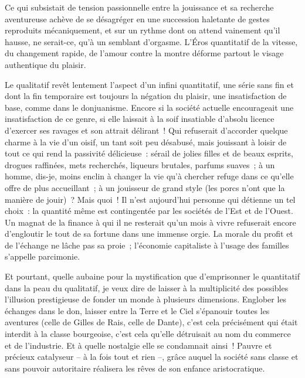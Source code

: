 \documentclass[french,twoside]{book} %
\begin{document}
\noindent Ce qui subsistait de tension passionnelle entre la jouissance et sa recherche aventureuse achève de se désagréger en une succession haletante de gestes reproduits mécaniquement, et sur un rythme dont on attend vainement qu’il hausse, ne serait-ce, qu’à un semblant d’orgasme. L’Éros quantitatif de la vitesse, du changement rapide, de l’amour contre la montre déforme partout le visage authentique du plaisir.\par
Le qualitatif revêt lentement l’aspect d’un infini quantitatif, une série sans fin et dont la fin temporaire est toujours la négation du plaisir, une insatisfaction de base, comme dans le donjuanisme. Encore si la société actuelle encourageait une insatisfaction de ce genre, si elle laissait à la soif insatiable d’absolu licence d’exercer ses ravages et son attrait délirant ! Qui refuserait d’accorder quelque charme à la vie d’un oisif, un tant soit peu désabusé, mais jouissant à loisir de tout ce qui rend la passivité délicieuse : sérail de jolies filles et de beaux esprits, drogues raffinées, mets recherchés, liqueurs brutales, parfums suaves ; à un homme, dis-je, moins enclin à changer la vie qu’à chercher refuge dans ce qu’elle offre de plus accueillant ; à un jouisseur de grand style (les porcs n’ont que la manière de jouir) ? Mais quoi ! Il n’est aujourd’hui personne qui détienne un tel choix : la quantité même est contingentée par les sociétés de l’Est et de l’Ouest. Un magnat de la finance à qui il ne resterait qu’un mois à vivre refuserait encore d’engloutir le tout de sa fortune dans une immense orgie. La morale du profit et de l’échange ne lâche pas sa proie ; l’économie capitaliste à l’usage des familles s’appelle parcimonie.\par
Et pourtant, quelle aubaine pour la mystification que d’emprisonner le quantitatif dans la peau du qualitatif, je veux dire de laisser à la multiplicité des possibles l’illusion prestigieuse de fonder un monde à plusieurs dimensions. Englober les échanges dans le don, laisser entre la Terre et le Ciel s’épanouir toutes les aventures (celle de Gilles de Rais, celle de Dante), c’est cela précisément qui était interdit à la classe bourgeoise, c’est cela qu’elle détruisait au nom du commerce et de l’industrie. Et à quelle nostalgie elle se condamnait ainsi ! Pauvre et précieux catalyseur – à la fois tout et rien –, grâce auquel la société sans classe et sans pouvoir autoritaire réalisera les rêves de son enfance aristocratique.\par
\end{document}
